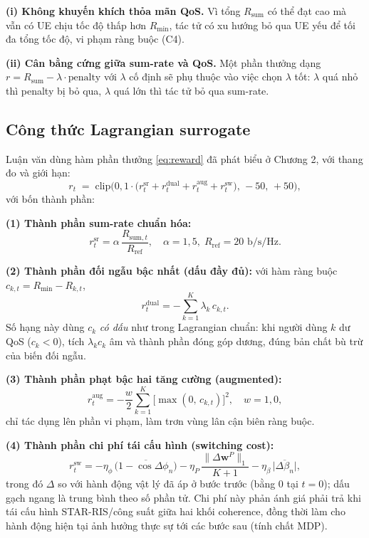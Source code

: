\textbf{(i) Không khuyến khích thỏa mãn QoS.} Vì tổng $R_{\text{sum}}$ có
thể đạt cao mà vẫn có UE chịu tốc độ thấp hơn $R_{\min}$, tác tử có xu
hướng bỏ qua UE yếu để tối đa tổng tốc độ, vi phạm ràng buộc (C4).

\textbf{(ii) Cân bằng cứng giữa sum-rate và QoS.} Một phần thưởng dạng
$r = R_{\text{sum}} - \lambda \cdot \text{penalty}$ với $\lambda$ cố
định sẽ phụ thuộc vào việc chọn $\lambda$ tốt: $\lambda$ quá nhỏ thì
penalty bị bỏ qua, $\lambda$ quá lớn thì tác tử bỏ qua sum-rate.

\subsection{Công thức Lagrangian surrogate}

Luận văn dùng hàm phần thưởng \eqref{eq:reward} đã phát biểu ở Chương 2,
với thang đo và giới hạn:
\begin{equation}
r_t \;=\; \mathrm{clip}\!\Big(0{,}1 \cdot \big(r^{\text{sr}}_t + r^{\text{dual}}_t
                                    + r^{\text{aug}}_t + r^{\text{sw}}_t\big),\,
                              -50,\, +50\Big),
\label{eq:reward_full}
\end{equation}
với bốn thành phần:

\textbf{(1) Thành phần sum-rate chuẩn hóa:}
\begin{equation}
r^{\text{sr}}_t = \alpha\,\frac{R_{\text{sum},t}}{R_{\text{ref}}},\quad
\alpha = 1{,}5,\; R_{\text{ref}} = 20 \text{ b/s/Hz}.
\label{eq:r_sr}
\end{equation}

\textbf{(2) Thành phần đối ngẫu bậc nhất (dấu đầy đủ):} với hàm ràng buộc
$c_{k,t} = R_{\min} - R_{k,t}$,
\begin{equation}
r^{\text{dual}}_t = -\sum_{k=1}^{K} \lambda_k\, c_{k,t}.
\label{eq:r_dual}
\end{equation}
Số hạng này dùng $c_k$ \emph{có dấu} như trong Lagrangian chuẩn: khi
người dùng $k$ dư QoS ($c_k < 0$), tích $\lambda_k c_k$ âm và thành phần
đóng góp dương, đúng bản chất bù trừ của biến đối ngẫu.

\textbf{(3) Thành phần phạt bậc hai tăng cường (augmented):}
\begin{equation}
r^{\text{aug}}_t = -\frac{w}{2}\sum_{k=1}^{K}\!\big[\max(0,\,c_{k,t})\big]^2,
\quad w = 1{,}0,
\label{eq:r_aug}
\end{equation}
chỉ tác dụng lên phần vi phạm, làm trơn vùng lân cận biên ràng buộc.

\textbf{(4) Thành phần chi phí tái cấu hình (switching cost):}
\begin{equation}
r^{\text{sw}}_t = -\eta_{\phi}\,\overline{\big(1-\cos\Delta\phi_n\big)}
                  -\eta_{P}\,\frac{\lVert\Delta\mathbf{w}^{P}\rVert_1}{K+1}
                  -\eta_{\beta}\,\overline{\lvert\Delta\beta_n\rvert},
\label{eq:r_switch}
\end{equation}
trong đó $\Delta$ so với hành động vật lý đã áp ở bước trước (bằng $0$
tại $t=0$); dấu gạch ngang là trung bình theo số phần tử. Chi phí này
phản ánh giá phải trả khi tái cấu hình STAR-RIS/công suất giữa hai khối
coherence, đồng thời làm cho hành động hiện tại ảnh hưởng thực sự tới
các bước sau (tính chất MDP).

